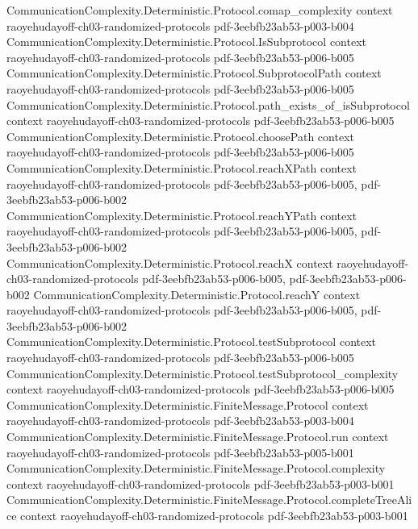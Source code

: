 \begin{theorem}
  {CommunicationComplexity.Deterministic.Protocol.comap_complexity}
  {context}
  {raoyehudayoff-ch03-randomized-protocols}
  {pdf-3eebfb23ab53-p003-b004}
\proofstep
  {CommunicationComplexity.Deterministic.Protocol.IsSubprotocol}
  {context}
  {raoyehudayoff-ch03-randomized-protocols}
  {pdf-3eebfb23ab53-p006-b005}
\proofstep
  {CommunicationComplexity.Deterministic.Protocol.SubprotocolPath}
  {context}
  {raoyehudayoff-ch03-randomized-protocols}
  {pdf-3eebfb23ab53-p006-b005}
\proofstep
  {CommunicationComplexity.Deterministic.Protocol.path_exists_of_isSubprotocol}
  {context}
  {raoyehudayoff-ch03-randomized-protocols}
  {pdf-3eebfb23ab53-p006-b005}
\proofstep
  {CommunicationComplexity.Deterministic.Protocol.choosePath}
  {context}
  {raoyehudayoff-ch03-randomized-protocols}
  {pdf-3eebfb23ab53-p006-b005}
\proofstep
  {CommunicationComplexity.Deterministic.Protocol.reachXPath}
  {context}
  {raoyehudayoff-ch03-randomized-protocols}
  {pdf-3eebfb23ab53-p006-b005,
    pdf-3eebfb23ab53-p006-b002}
\proofstep
  {CommunicationComplexity.Deterministic.Protocol.reachYPath}
  {context}
  {raoyehudayoff-ch03-randomized-protocols}
  {pdf-3eebfb23ab53-p006-b005,
    pdf-3eebfb23ab53-p006-b002}
\proofstep
  {CommunicationComplexity.Deterministic.Protocol.reachX}
  {context}
  {raoyehudayoff-ch03-randomized-protocols}
  {pdf-3eebfb23ab53-p006-b005,
    pdf-3eebfb23ab53-p006-b002}
\proofstep
  {CommunicationComplexity.Deterministic.Protocol.reachY}
  {context}
  {raoyehudayoff-ch03-randomized-protocols}
  {pdf-3eebfb23ab53-p006-b005,
    pdf-3eebfb23ab53-p006-b002}
\proofstep
  {CommunicationComplexity.Deterministic.Protocol.testSubprotocol}
  {context}
  {raoyehudayoff-ch03-randomized-protocols}
  {pdf-3eebfb23ab53-p006-b005}
\proofstep
  {CommunicationComplexity.Deterministic.Protocol.testSubprotocol_complexity}
  {context}
  {raoyehudayoff-ch03-randomized-protocols}
  {pdf-3eebfb23ab53-p006-b005}
\proofstep
  {CommunicationComplexity.Deterministic.FiniteMessage.Protocol}
  {context}
  {raoyehudayoff-ch03-randomized-protocols}
  {pdf-3eebfb23ab53-p003-b004}
\proofstep
  {CommunicationComplexity.Deterministic.FiniteMessage.Protocol.run}
  {context}
  {raoyehudayoff-ch03-randomized-protocols}
  {pdf-3eebfb23ab53-p005-b001}
\proofstep
  {CommunicationComplexity.Deterministic.FiniteMessage.Protocol.complexity}
  {context}
  {raoyehudayoff-ch03-randomized-protocols}
  {pdf-3eebfb23ab53-p003-b001}
\proofstep
  {CommunicationComplexity.Deterministic.FiniteMessage.Protocol.completeTreeAlice}
  {context}
  {raoyehudayoff-ch03-randomized-protocols}
  {pdf-3eebfb23ab53-p003-b001}

\end{theorem}

